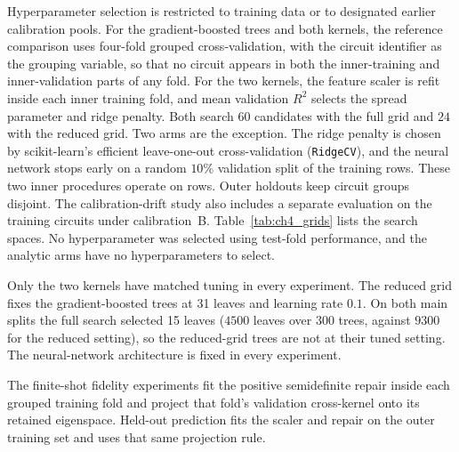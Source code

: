 \documentclass[Thesis.tex]{subfiles}
\begin{document}
Hyperparameter selection is restricted to training data or to designated earlier
calibration pools. For the gradient-boosted trees and both kernels, the reference
comparison uses four-fold grouped cross-validation,
with the circuit identifier as the grouping variable, so that no circuit appears in
both the inner-training and inner-validation parts of any fold. For the two kernels,
the feature scaler is refit inside each inner training fold, and mean validation
$R^2$ selects the spread parameter and ridge penalty. Both search $60$ candidates
with the full grid and $24$ with the reduced grid. Two arms are the
exception. The ridge penalty is chosen by scikit-learn's efficient leave-one-out
cross-validation (\texttt{RidgeCV}), and the neural network stops early on a random
$10\%$ validation split of the training rows. These two inner procedures operate
on rows. Outer holdouts keep circuit groups disjoint. The calibration-drift
study also includes a separate evaluation on the training circuits under
calibration~B. Table~\ref{tab:ch4_grids}
lists the search spaces. No hyperparameter was selected using test-fold performance,
and the analytic arms have no hyperparameters to select.

Only the two kernels have matched tuning in every experiment. The reduced grid fixes
the gradient-boosted trees at 31 leaves and learning rate $0.1$. On both main splits
the full search selected 15 leaves ($4500$ leaves over $300$ trees, against $9300$ for
the reduced setting), so the reduced-grid trees are not at their tuned setting. The
neural-network architecture is fixed in every experiment.

The finite-shot fidelity experiments fit the positive semidefinite repair
inside each grouped training fold and project that fold's validation
cross-kernel onto its retained eigenspace. Held-out prediction fits the scaler
and repair on the outer training set and uses that same projection rule.
\end{document}
